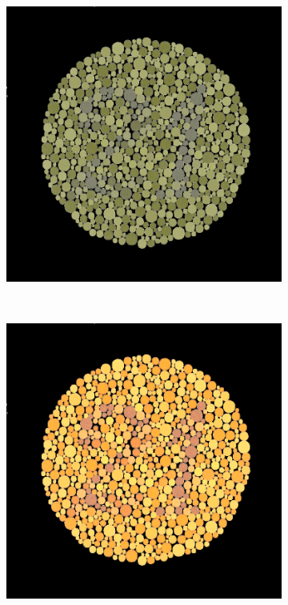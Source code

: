 \documentclass{sig-alternate-05-2015}
\begin{document}
\begin{figure}
\begin{subfigure}[t]{0.5\columnwidth}
    \end{subfigure}
    \begin{subfigure}[t]{0.5\columnwidth}
        \includegraphics[width=\textwidth]{74_protanope_zero.png}
    \end{subfigure}
    \\
    \begin{subfigure}[t]{0.5\columnwidth}
        \includegraphics[width=\textwidth]{74_deuteranope.png}

\end{subfigure}
\end{figure}
\end{document}
